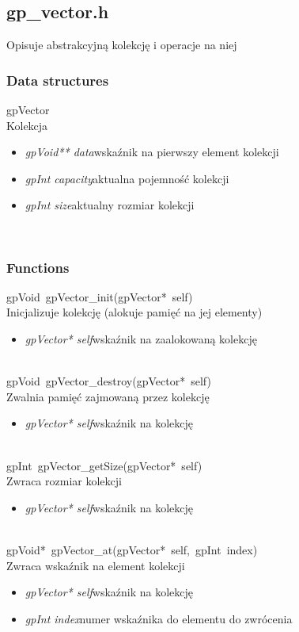 \subsection{gp_vector.h}
Opisuje abstrakcyjną kolekcję i operacje na niej
\subsubsection{Data structures}
\textsf{gpVector}	\\ \indent Kolekcja
	\begin{itemize}
		\item \textit{gpVoid** data}\quad wskaźnik na pierwszy element kolekcji
		\item \textit{gpInt capacity}\quad aktualna pojemność kolekcji
		\item \textit{gpInt size}\quad aktualny rozmiar kolekcji
	\end{itemize}
\ \\
\subsubsection{Functions}
\mbox{\textsf{gpVoid gpVector_init(gpVector* self)}} \\ \indent Inicjalizuje kolekcję (alokuje pamięć na jej elementy)
	\begin{itemize}
		\item \textit{gpVector* self}\quad wskaźnik na zaalokowaną kolekcję
	\end{itemize}

 \ \\
\mbox{\textsf{gpVoid gpVector_destroy(gpVector* self)}} \\ \indent Zwalnia pamięć zajmowaną przez kolekcję
	\begin{itemize}
		\item \textit{gpVector* self}\quad wskaźnik na kolekcję
	\end{itemize}

 \ \\
\mbox{\textsf{gpInt gpVector_getSize(gpVector* self)}} \\ \indent Zwraca rozmiar kolekcji
	\begin{itemize}
		\item \textit{gpVector* self}\quad wskaźnik na kolekcję
	\end{itemize}

 \ \\
\mbox{\textsf{gpVoid* gpVector_at(gpVector* self, gpInt index)}} \\ \indent Zwraca wskaźnik na element kolekcji
	\begin{itemize}
		\item \textit{gpVector* self}\quad wskaźnik na kolekcję
		\item \textit{gpInt index}\quad numer wskaźnika do elementu do zwrócenia
	\end{itemize}

